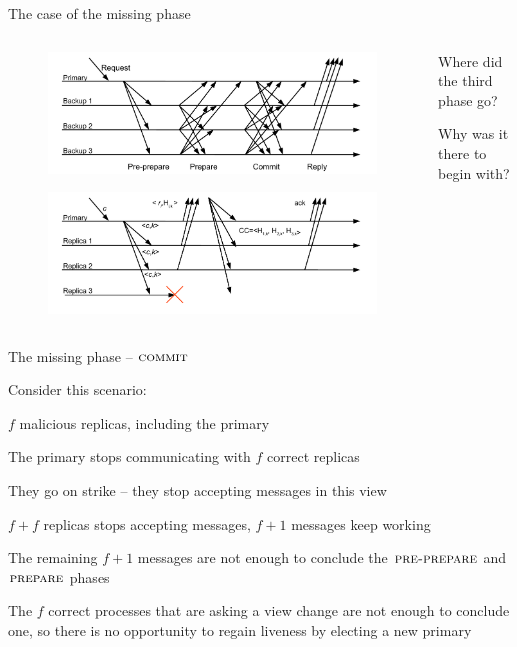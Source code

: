 \begin{frame}{The case of the missing phase}

\begin{columns}
\begin{column}{0.6\textwidth}
\begin{figure}
	\includegraphics[width=\textwidth]{figs/17/messages4}
\end{figure}
\begin{figure}
	\includegraphics[width=\textwidth]{figs/17/messages10}	
\end{figure}
\end{column}
\begin{column}{0.4\textwidth}
\BIL
\item Where did the third phase go?
\item Why was it there to begin with?
\EIL	
\end{column}
\end{columns}
\end{frame}

\begin{frame}{The missing phase -- $\textsc{commit}$}
	
Consider this scenario:
\BI
\item $f$ malicious replicas, including the primary
\item The primary stops communicating with $f$ correct replicas
\item They go on strike -- they stop accepting messages in this view
\item $f+f$ replicas stops accepting messages, $f+1$ messages keep working
\item The remaining $f+1$ messages are not enough to conclude the $\textsc{pre-prepare}$ and
  $\textsc{prepare}$ phases
\item The $f$ correct processes that are asking a view change are not enough
  to conclude one, so there is no opportunity to regain liveness by electing
  a new primary
\EI
		
\end{frame}	


